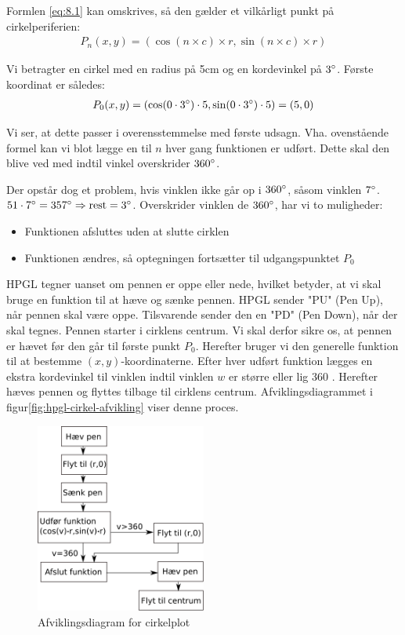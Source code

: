 Formlen \vref{eq:8.1} kan omskrives, så den gælder et vilkårligt punkt
på cirkelperiferien:
\begin{align}
P_n(x, y)=(\cos(n\times c)\times r, \sin(n\times c)\times r)
\end{align}

Vi betragter en cirkel med en radius på 5cm og en kordevinkel på
$3^\circ$. Første koordinat er således:
\begin{align*}
P_0(x, y)&=(\cos(0\cdot 3^\circ)\cdot 5 , \sin(0\cdot 3^\circ)\cdot 5)=(5, 0) \\
\end{align*}

Vi ser, at dette passer i overensstemmelse med første
udsagn. Vha. ovenstående formel kan vi blot lægge en til $n$ hver gang
funktionen er udført. Dette skal den blive ved med indtil vinkel
overskrider $360^\circ$.


Der opstår dog et problem, hvis vinklen ikke går op i $360^\circ$,
såsom vinklen $7^\circ$. $51\cdot 7^\circ = 357^\circ \Rightarrow
\textup{rest} = 3^\circ$. Overskrider vinklen de $360^\circ$, har vi to
muligheder:
\begin{itemize} \firmlist
\item Funktionen afsluttes uden at slutte cirklen
\item Funktionen ændres, så optegningen fortsætter til udgangspunktet $P_0$
\end{itemize}
HPGL tegner uanset om pennen er oppe eller nede, hvilket betyder, at
vi skal bruge en funktion til at hæve og sænke pennen. HPGL sender
"PU" (Pen Up), når pennen skal være oppe. Tilsvarende sender den en
"PD" (Pen Down), når der skal tegnes. Pennen starter i cirklens
centrum. Vi skal derfor sikre os, at pennen er hævet før den går til
første punkt $P_0$. Herefter bruger vi den generelle funktion til at
bestemme $(x, y)$-koordinaterne. Efter hver udført funktion lægges en
ekstra kordevinkel til vinklen indtil vinklen $w$ er større eller lig
360 \degree. Herefter hæves pennen og flyttes tilbage til cirklens
centrum. Afviklingsdiagrammet i figur\vref{fig:hpgl-cirkel-afvikling}
viser denne proces. 

\begin{figure}[htbp]
  \centering
  \includegraphics[width=0.5\textwidth]{./img/afviklingsdiagram-cirkel}
  \caption{Afviklingsdiagram for cirkelplot}
  \label{fig:hpgl-cirkel-afvikling}
\end{figure}


